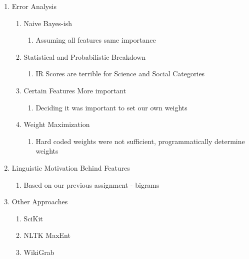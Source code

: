 \documentclass[11pt]{article}
\begin{document}
\begin{enumerate}
\item Error Analysis
	\begin{enumerate}
		\item Naive Bayes-ish
			\begin{enumerate}
				\item Assuming all features same importance
			\end{enumerate}
		\item Statistical and Probabilistic Breakdown
			\begin{enumerate}
				\item IR Scores are terrible for Science and Social Categories
			\end{enumerate}
		\item Certain Features More important
			\begin{enumerate}
				\item Deciding it was important to set our own weights
			\end{enumerate}
		\item Weight Maximization
			\begin{enumerate}
				\item Hard coded weights were not sufficient, programmatically determine weights
			\end{enumerate}
	\end{enumerate}

\item Linguistic Motivation Behind Features
	\begin{enumerate}
		\item Based on our previous assignment - bigrams
	\end{enumerate}
\item Other Approaches
	\begin{enumerate}
		\item SciKit
		\item NLTK MaxEnt
		\item WikiGrab
	\end{enumerate}
\end{enumerate}
\end{document}
